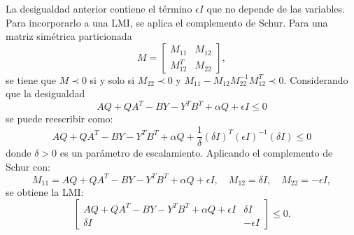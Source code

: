 \begin{itemize}
La desigualdad anterior contiene el término \(\epsilon I\) que no depende de las variables. Para incorporarlo a una LMI, se aplica el complemento de Schur. Para una matriz simétrica particionada
\begin{equation*}
    M = \begin{bmatrix} M_{11} & M_{12} \\ M_{12}^T & M_{22} \end{bmatrix},
\end{equation*}
se tiene que \(M \prec 0\) si y solo si \(M_{22} \prec 0\) y \(M_{11} - M_{12} M_{22}^{-1} M_{12}^T \prec 0\). Considerando que la desigualdad
\begin{equation*}
    A Q + Q A^T - B Y - Y^T B^T + \alpha Q + \epsilon I \leq 0
\end{equation*}
se puede reescribir como:
\begin{equation*}
    A Q + Q A^T - B Y - Y^T B^T + \alpha Q + \frac{1}{\delta} (\delta I)^T (\epsilon I)^{-1} (\delta I) \leq 0
\end{equation*}
donde \(\delta > 0\) es un parámetro de escalamiento. Aplicando el complemento de Schur con:
\begin{equation*}
    M_{11} = A Q + Q A^T - B Y - Y^T B^T + \alpha Q + \epsilon I, \quad
    M_{12} = \delta I, \quad
    M_{22} = -\epsilon I,
\end{equation*}
se obtiene la LMI:
\begin{equation*}
    \begin{bmatrix}
        A Q + Q A^T - B Y - Y^T B^T + \alpha Q + \epsilon I & \delta I \\
        \delta I & -\epsilon I
    \end{bmatrix} \leq 0.
\end{equation*}


\end{itemize}
